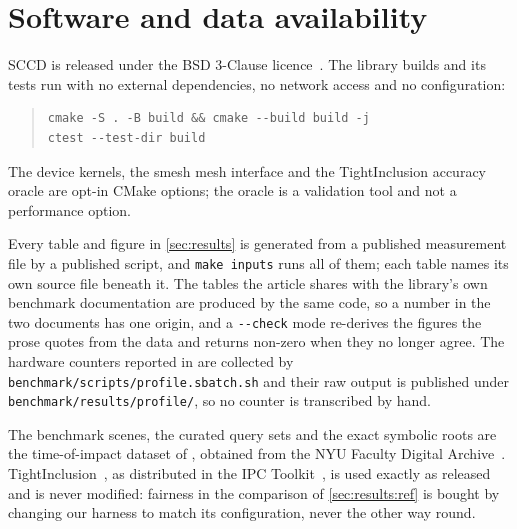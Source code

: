 \section{Software and data availability}
\label{sec:availability}

SCCD is released under the BSD 3-Clause licence~\citep{sccd}. The library builds
and its tests run with no external dependencies, no network access and no
configuration:

\begin{quote}
\begin{verbatim}
cmake -S . -B build && cmake --build build -j
ctest --test-dir build
\end{verbatim}
\end{quote}

\noindent
The device kernels, the smesh mesh interface and the TightInclusion accuracy
oracle are opt-in CMake options; the oracle is a validation tool and not a
performance option.

Every table and figure in \cref{sec:results} is generated from a published
measurement file by a published script, and \verb|make inputs| runs all of them;
each table names its own source file beneath it. The tables the article shares
with the library's own benchmark documentation are produced by the same code, so
a number in the two documents has one origin, and a \verb|--check| mode
re-derives the figures the prose quotes from the data and returns non-zero when
they no longer agree. The hardware counters reported in \supp{} are collected by
\texttt{benchmark/scripts/profile.sbatch.sh} and their raw output is published
under \texttt{benchmark/results/profile/}, so no counter is transcribed by hand.

The benchmark scenes, the curated query sets and the exact symbolic roots are
the time-of-impact dataset of \citet{belgrod2025toi}, obtained from the NYU
Faculty Digital Archive~\citep{nyuccd}. TightInclusion~\citep{wang2021tight}, as
distributed in the IPC Toolkit~\citep{ipctoolkit}, is used exactly as released
and is never modified: fairness in the comparison of \cref{sec:results:ref} is
bought by changing our harness to match its configuration, never the other way
round.
